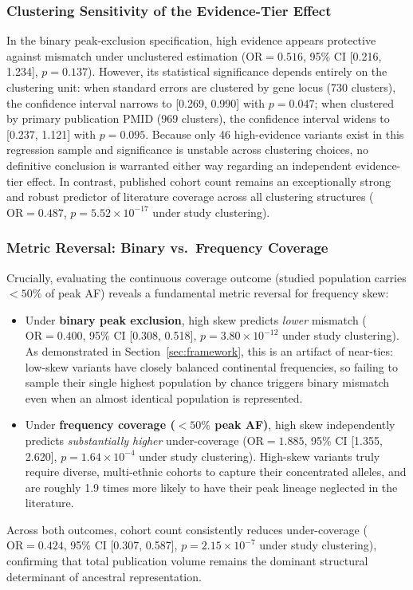 \documentclass[conference]{IEEEtran}
\begin{document}
\begin{table}[!t]
\subsubsection{Clustering Sensitivity of the Evidence-Tier Effect}
In the binary peak-exclusion specification, high evidence appears protective against mismatch under unclustered estimation ($\text{OR} = 0.516$, 95\% CI [0.216, 1.234], $p = 0.137$).
However, its statistical significance depends entirely on the clustering unit: when standard errors are clustered by gene locus (730 clusters), the confidence interval narrows to [0.269, 0.990] with $p = 0.047$; when clustered by primary publication PMID (969 clusters), the confidence interval widens to [0.237, 1.121] with $p = 0.095$.
Because only 46 high-evidence variants exist in this regression sample and significance is unstable across clustering choices, no definitive conclusion is warranted either way regarding an independent evidence-tier effect.
In contrast, published cohort count remains an exceptionally strong and robust predictor of literature coverage across all clustering structures ($\text{OR} = 0.487$, $p = 5.52 \times 10^{-17}$ under study clustering).

\subsubsection{Metric Reversal: Binary vs.\ Frequency Coverage}
Crucially, evaluating the continuous coverage outcome (studied population carries $< 50\%$ of peak AF) reveals a fundamental metric reversal for frequency skew:
\begin{itemize}
    \item Under \textbf{binary peak exclusion}, high skew predicts \emph{lower} mismatch ($\text{OR} = 0.400$, 95\% CI [0.308, 0.518], $p = 3.80 \times 10^{-12}$ under study clustering). As demonstrated in Section~\ref{sec:framework}, this is an artifact of near-ties: low-skew variants have closely balanced continental frequencies, so failing to sample their single highest population by chance triggers binary mismatch even when an almost identical population is represented.
    \item Under \textbf{frequency coverage ($<50\%$ peak AF)}, high skew independently predicts \emph{substantially higher} under-coverage ($\text{OR} = 1.885$, 95\% CI [1.355, 2.620], $p = 1.64 \times 10^{-4}$ under study clustering). High-skew variants truly require diverse, multi-ethnic cohorts to capture their concentrated alleles, and are roughly 1.9 times more likely to have their peak lineage neglected in the literature.
\end{itemize}
Across both outcomes, cohort count consistently reduces under-coverage ($\text{OR} = 0.424$, 95\% CI [0.307, 0.587], $p = 2.15 \times 10^{-7}$ under study clustering), confirming that total publication volume remains the dominant structural determinant of ancestral representation.


\end{table}
\end{document}
